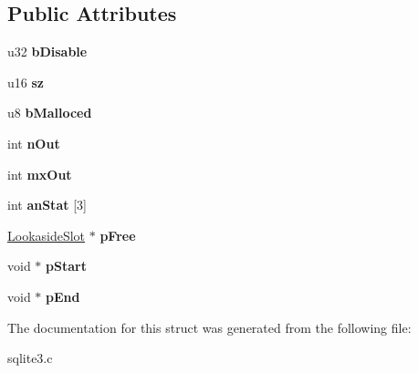 \subsection*{Public Attributes}
\begin{DoxyCompactItemize}
\item 
u32 {\bfseries b\+Disable}\hypertarget{structLookaside_ac81ee3b5b12d0bc89ed1286718224db1}{}\label{structLookaside_ac81ee3b5b12d0bc89ed1286718224db1}

\item 
u16 {\bfseries sz}\hypertarget{structLookaside_a2e8346b6cebbb64d9a6886a19ef843a1}{}\label{structLookaside_a2e8346b6cebbb64d9a6886a19ef843a1}

\item 
u8 {\bfseries b\+Malloced}\hypertarget{structLookaside_a218f14cf9eb2c430867d286e9ac57ac5}{}\label{structLookaside_a218f14cf9eb2c430867d286e9ac57ac5}

\item 
int {\bfseries n\+Out}\hypertarget{structLookaside_a4cdd49fa554f877928d5bb31d55b32e9}{}\label{structLookaside_a4cdd49fa554f877928d5bb31d55b32e9}

\item 
int {\bfseries mx\+Out}\hypertarget{structLookaside_a2ce364d95b55913df986999de442e4f9}{}\label{structLookaside_a2ce364d95b55913df986999de442e4f9}

\item 
int {\bfseries an\+Stat} \mbox{[}3\mbox{]}\hypertarget{structLookaside_a7d875204cb05a327bb1652139faa4374}{}\label{structLookaside_a7d875204cb05a327bb1652139faa4374}

\item 
\hyperlink{structLookasideSlot}{Lookaside\+Slot} $\ast$ {\bfseries p\+Free}\hypertarget{structLookaside_a318d2faa7f976f9d1b3c6e08bdc1d992}{}\label{structLookaside_a318d2faa7f976f9d1b3c6e08bdc1d992}

\item 
void $\ast$ {\bfseries p\+Start}\hypertarget{structLookaside_a47073fcdffdc5a7a1464f0d09bfc17f9}{}\label{structLookaside_a47073fcdffdc5a7a1464f0d09bfc17f9}

\item 
void $\ast$ {\bfseries p\+End}\hypertarget{structLookaside_ad3555c5558e104f2b82f62bf642cf831}{}\label{structLookaside_ad3555c5558e104f2b82f62bf642cf831}

\end{DoxyCompactItemize}


The documentation for this struct was generated from the following file\+:\begin{DoxyCompactItemize}
\item 
sqlite3.\+c\end{DoxyCompactItemize}
